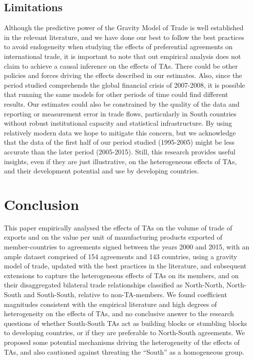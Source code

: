 \subsection{Limitations}%
\label{subsec:Limitations}%
Although the predictive power of the Gravity Model of Trade is well
established in the relevant literature, and we have done our best to
follow the best practices to avoid endogeneity when studying the effects
of preferential agreements on international trade, it is important to
note that out empirical analysis does not claim to achieve a causal
inference on the effects of TAs. There could be other policies and
forces driving the effects described in our estimates. Also, since the
period studied comprehends the global financial crisis of 2007-2008, it
is possible that running the same models for other periods of time could
find different results. Our estimates could also be constrained by the
quality of the data and reporting or measurement error in trade flows,
particularly in South countries without robust institutional capacity
and statistical infrastructure. By using relatively modern data we hope
to mitigate this concern, but we acknowledge that the data of the first
half of our period studied (1995-2005) might be less accurate than the
later period (2005-2015). Still, this research provides useful insights,
even if they are just illustrative, on the heterogeneous effects of TAs,
and their development potential and use by developing countries.

%
\section{Conclusion}%
\label{sec:Conclusion}%
This paper empirically analysed the effects of TAs on the volume of
trade of exports and on the value per unit of manufacturing products
exported of member-countries to agreements signed between the years 2000
and 2015, with an ample dataset comprised of 154 agreements and 143
countries, using a gravity model of trade, updated with the best
practices in the literature, and subsequent extensions to capture the
heterogeneous effects of TAs on its members, and on their disaggregated
bilateral trade relationships classified as North-North, North-South and
South-South, relative to non-TA-members. We found coefficient magnitudes
consistent with the empirical literature and high degrees of
heterogeneity on the effects of TAs, and no conclusive answer to the
research questions of whether South-South TAs act as building blocks or
stumbling blocks to developing countries, or if they are preferable to
North-South agreements. We proposed some potential mechanisms driving
the heterogeneity of the effects of TAs, and also cautioned against
threating the ``South'' as a homogeneous group.

